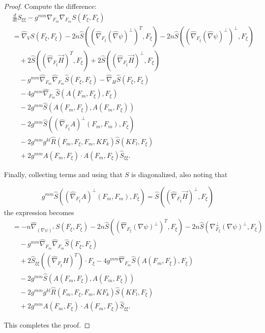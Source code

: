 \documentclass[12pt,letterpaper]{amsart}%
\numberwithin{mycounter}{section}
\theoremstyle{plain}
\numberwithin{equation}{section}
\theoremstyle{definition}
\newcommand{\maxidx}{\mathord{\xi}} %
\begin{document}
\begin{proof}
Compute the difference:
\begin{align*}
& \frac{d}{dt}S_{\maxidx\maxidx}
 -g^{mm}\nabla _{F_{m}}\nabla _{F_{m}}S(F_{\maxidx},F_{\maxidx}) \\
&= \hat{\nabla}_{V}S(F_{\maxidx},F_{\maxidx})
 -2n\hat{S}((\hat{\nabla}_{F_{\maxidx}}(\hat{\nabla}\psi )^{\perp })^{T},F_{\maxidx})
 -2n\hat{S}((\hat{\nabla}_{F_{\maxidx}}(\hat{\nabla}\psi )^{\perp })^{\perp},F_{\maxidx}) \\
& \quad +2\hat{S}((\hat{\nabla}_{F_{\maxidx}}\vec{H})^{T},F_{\maxidx})
       +2\hat{S}((\hat{\nabla}_{F_{\maxidx}}\vec{H})^{\perp },F_{\maxidx}) \\
& \quad -g^{mm}\hat{\nabla}_{F_{m}}\hat{\nabla}_{F_{m}}\hat{S}(F_{\maxidx},F_{\maxidx})
       -\hat{\nabla}_{H}\hat{S}(F_{\maxidx},F_{\maxidx}) \\
& \quad -4g^{mm}\hat{\nabla}_{F_{m}}\hat{S}(A(F_{m},F_{\maxidx}),F_{\maxidx}) \\
& \quad -2g^{mm}\hat{S}(A(F_{m},F_{\maxidx}),A(F_{m},F_{\maxidx})) \\
& \quad -2g^{mm}\hat{S}\!\left( (\hat{\nabla}_{F_{\maxidx}}A)^{\perp}
        (F_{m},F_{m}),F_{\maxidx}\right)  \\
& \quad -2g^{mm} g^{kl} \hat{R}(F_{m},F_{\maxidx},F_{m},KF_{k})\hat{S}(KF_{l},F_{\maxidx}) \\
& \quad +2g^{mm}A(F_{m},F_{\maxidx})\cdot A(F_{m},F_{\maxidx})\hat{S}_{\maxidx\maxidx}.
\end{align*}

Finally, collecting terms and using that \(S\) is diagonalized, also noting that 

$$ 
g^{mm}\hat{S}\!\left( (\hat{\nabla}_{F_{\maxidx}}A)^{\perp}
        (F_{m},F_{m}),F_{\maxidx}\right) = \hat{S}((\hat{\nabla}_{F_{\maxidx}}\vec{H})^{\perp },F_{\maxidx}) $$
the expression becomes
\begin{align*}
&=-n\hat{\nabla}_{(\nabla \psi )^{\perp }}S(F_{\maxidx},F_{\maxidx})
   -2n\hat{S}((\hat{\nabla}_{F_{\maxidx}}(\nabla \psi )^{\perp })^{T},F_{\maxidx})
   -2n\hat{S}(\nabla _{F_{\maxidx}}^{\perp }(\nabla \psi )^{\perp },F_{\maxidx}) \\
&\quad -g^{mm}\hat{\nabla}_{F_{m}}\hat{\nabla}_{F_{m}}\hat{S}(F_{\maxidx},F_{\maxidx}) \\
&\quad +2\hat{S}_{\maxidx\maxidx}((\hat{\nabla}_{F_{\maxidx}}H)^{T})\cdot F_{\maxidx}
       -4g^{mm}\hat{\nabla}_{F_{m}}\hat{S}(A(F_{m},F_{\maxidx}),F_{\maxidx}) \\
&\quad -2g^{mm}\hat{S}(A(F_{m},F_{\maxidx}),A(F_{m},F_{\maxidx})) \\
&\quad -2g^{mm} g^{kl}\hat{R}(F_{m},F_{\maxidx},F_{m},KF_{k})\hat{S}(KF_{l},F_{\maxidx}) \\
&\quad +2g^{mm}A(F_{m},F_{\maxidx})\cdot A(F_{m},F_{\maxidx})\hat{S}_{\maxidx\maxidx}.
\end{align*}

This completes the proof.
\end{proof}
\end{document}
